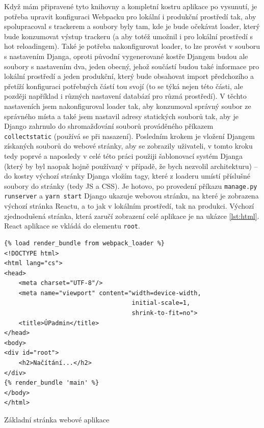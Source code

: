     Když mám připravené tyto knihovny a kompletní kostru aplikace po vysunutí, je potřeba upravit konfiguraci Webpacku pro lokální i produkční prostředí tak, aby spolupracoval s trackerem a soubory byly tam, kde je bude očekávat loader, který bude konzumovat výstup trackeru (a aby totéž umožnil i pro lokální prostředí s hot reloadingem). Také je potřeba nakonfigurovat loader, to lze provést v souboru s nastavením Djanga, oproti původní vygenerované kostře Djangem budou ale soubory s nastavením dva, jeden obecný, jehož součástí budou také informace pro lokální prostředí a jeden produkční, který bude obsahovat import předchozího a přetíží konfiguraci potřebných částí tou svojí (to se týká nejen této části, ale později například i různých nastavení databází pro různá prostředí). V těchto nastaveních jsem nakonfiguroval loader tak, aby konzumoval správný soubor ze správného místa a také jsem nastavil adresy statických souborů tak, aby je Django zahrnulo do shromažďování souborů prováděného příkazem \verb|collectstatic| (používá se při nasazení). Posledním krokem je vložení Djangem získaných souborů do webové stránky, aby se zobrazily uživateli, v tomto kroku tedy poprvé a naposledy v celé této práci použiji šablonovací systém Djanga (který by byl naopak hojně používaný v případě, že bych nezvolil architekturu) -- do kostry výchozí stránky Djanga vložím tagy, které z loaderu umístí příslušné soubory do stránky (tedy JS a CSS). Je hotovo, po provedení příkazu \verb|manage.py runserver| a \verb|yarn start| Django ukazuje webovou stránku, na které je zobrazena výchozí stránka Reactu, a to jak v lokálním prostředí, tak na produkci. Výchozí zjednodušená stránka, která zaručí zobrazení celé aplikace je na ukázce \ref{lst:html}. React aplikace se vkládá do elementu \verb|root|.
    
    \begin{listing}[ht]
    	\begin{verbatim}
{% load render_bundle from webpack_loader %}
<!DOCTYPE html>
<html lang="cs">
<head>
    <meta charset="UTF-8"/>
    <meta name="viewport" content="width=device-width,
                                   initial-scale=1,
                                   shrink-to-fit=no">
    <title>ÚPadmin</title>
</head>
<body>
<div id="root">
    <h2>Načítání...</h2>
</div>
{% render_bundle 'main' %}
</body>
</html>
    	\end{verbatim}
    	\caption{Základní stránka webové aplikace}\label{lst:html}
    \end{listing}
    
